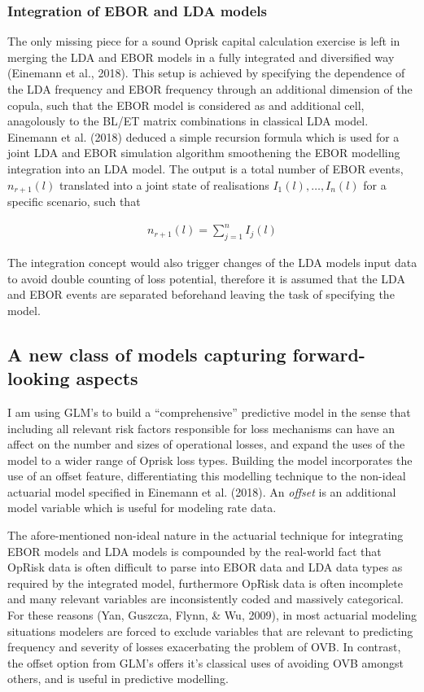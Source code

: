 \documentclass{DissertateUSU}
\begin{document}
\subsubsection{Integration of EBOR and LDA models}

The only missing piece for a sound Oprisk capital calculation exercise
is left in merging the LDA and EBOR models in a fully integrated and
diversified way (Einemann et al., 2018). This setup is achieved by
specifying the dependence of the LDA frequency and EBOR frequency
through an additional dimension of the copula, such that the EBOR model
is considered as and additional cell, anagolously to the BL/ET matrix
combinations in classical LDA model. Einemann et al. (2018) deduced a
simple recursion formula which is used for a joint LDA and EBOR
simulation algorithm smoothening the EBOR modelling integration into an
LDA model. The output is a total number of EBOR events, \(n_{r+1}(l)\)
translated into a joint state of realisations \(I_1(l),\ldots,I_n(l)\)
for a specific scenario, such that

\singlespacing

\begin{eqnarray}\label{EBORexposure}
n_{r+1}(l)=\sum_{j=1}^n I_j(l)
\end{eqnarray} \doublespacing

The integration concept would also trigger changes of the LDA models
input data to avoid double counting of loss potential, therefore it is
assumed that the LDA and EBOR events are separated beforehand leaving
the task of specifying the model.

\subsection{A new class of models capturing forward-looking aspects}
\label{sec:A new class of models capturing forward-looking aspects}

I am using GLM's to build a ``comprehensive'' predictive model in the
sense that including all relevant risk factors responsible for loss
mechanisms can have an affect on the number and sizes of operational
losses, and expand the uses of the model to a wider range of Oprisk loss
types. Building the model incorporates the use of an offset feature,
differentiating this modelling technique to the non-ideal actuarial
model specified in Einemann et al. (2018). An \emph{offset} is an
additional model variable which is useful for modeling rate
data.\medskip

The afore-mentioned non-ideal nature in the actuarial technique for
integrating EBOR models and LDA models is compounded by the real-world
fact that OpRisk data is often difficult to parse into EBOR data and LDA
data types as required by the integrated model, furthermore OpRisk data
is often incomplete and many relevant variables are inconsistently coded
and massively categorical. For these reasons (Yan, Guszcza, Flynn, \&
Wu, 2009), in most actuarial modeling situations modelers are forced to
exclude variables that are relevant to predicting frequency and severity
of losses exacerbating the problem of OVB. In contrast, the offset
option from GLM's offers it's classical uses of avoiding OVB amongst
others, and is useful in predictive modelling.\medskip
\end{document}
